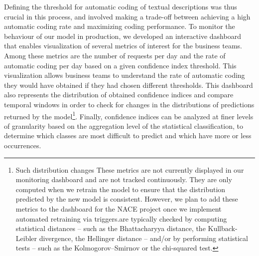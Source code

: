 \documentclass[graybox]{svmult}
\begin{document}
Defining the threshold for automatic coding of textual descriptions was thus crucial in this process, and involved making a trade-off between achieving a high automatic coding rate and maximizing coding performance. To monitor the behaviour of our model in production, we developed an interactive dashboard that enables visualization of several metrics of interest for the business teams. Among these metrics are the number of requests per day and the rate of automatic coding per day based on a given confidence index threshold. This visualization allows business teams to understand the rate of automatic coding they would have obtained if they had chosen different thresholds. This dashboard also represents the distribution of obtained confidence indices and compare temporal windows in order to check for changes in the distributions of predictions returned by the model\footnote{Such distribution changes These metrics are not currently displayed in our monitoring dashboard and are not tracked continuously. They are only computed when we retrain the model to ensure that the distribution predicted by the new model is consistent. However, we plan to add these metrics to the dashboard for the NACE project once we implement automated retraining via triggers.are typically checked by computing statistical distances -- such as the Bhattacharyya distance, the Kullback-Leibler divergence, the Hellinger distance -- and/or by performing statistical tests -- such as the Kolmogorov–Smirnov or the chi-squared test.}. Finally, confidence indices can be analyzed at finer levels of granularity based on the aggregation level of the statistical classification, to determine which classes are most difficult to predict and which have more or less occurrences.
\end{document}
